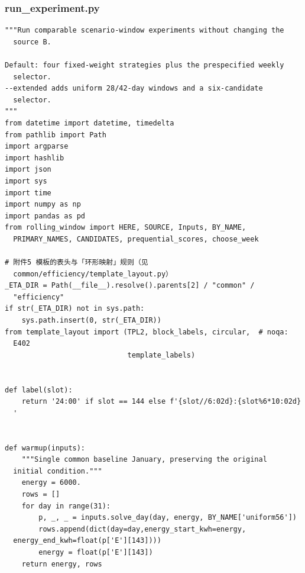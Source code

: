 \subsubsection*{run\_experiment.py}
\begin{verbatim}
"""Run comparable scenario-window experiments without changing the
  source B.

Default: four fixed-weight strategies plus the prespecified weekly
  selector.
--extended adds uniform 28/42-day windows and a six-candidate
  selector.
"""
from datetime import datetime, timedelta
from pathlib import Path
import argparse
import hashlib
import json
import sys
import time
import numpy as np
import pandas as pd
from rolling_window import HERE, SOURCE, Inputs, BY_NAME,
  PRIMARY_NAMES, CANDIDATES, prequential_scores, choose_week

# 附件5 模板的表头与「环形映射」规则（见
  common/efficiency/template_layout.py）
_ETA_DIR = Path(__file__).resolve().parents[2] / "common" /
  "efficiency"
if str(_ETA_DIR) not in sys.path:
    sys.path.insert(0, str(_ETA_DIR))
from template_layout import (TPL2, block_labels, circular,  # noqa:
  E402
                             template_labels)


def label(slot):
    return '24:00' if slot == 144 else f'{slot//6:02d}:{slot%6*10:02d}
  '


def warmup(inputs):
    """Single common baseline January, preserving the original
  initial condition."""
    energy = 6000.
    rows = []
    for day in range(31):
        p, _, _ = inputs.solve_day(day, energy, BY_NAME['uniform56'])
        rows.append(dict(day=day,energy_start_kwh=energy,
  energy_end_kwh=float(p['E'][143])))
        energy = float(p['E'][143])
    return energy, rows



\end{verbatim}
